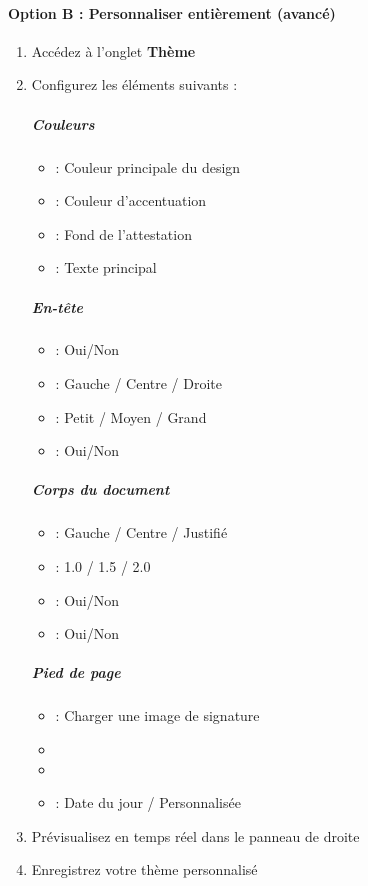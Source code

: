 \paragraph{Option B : Personnaliser entièrement (avancé)}

\begin{enumerate}[leftmargin=*]
    \item Accédez à l'onglet \textbf{Thème}
    \item Configurez les éléments suivants :

    \subparagraph{Couleurs}
    \begin{itemize}
        \item {} : Couleur principale du design
        \item {} : Couleur d'accentuation
        \item {} : Fond de l'attestation
        \item {} : Texte principal
    \end{itemize}

    \subparagraph{En-tête}
    \begin{itemize}
        \item {} : Oui/Non
        \item {} : Gauche / Centre / Droite
        \item {} : Petit / Moyen / Grand
        \item {} : Oui/Non
    \end{itemize}

    \subparagraph{Corps du document}
    \begin{itemize}
        \item {} : Gauche / Centre / Justifié
        \item {} : 1.0 / 1.5 / 2.0
        \item {} : Oui/Non
        \item {} : Oui/Non
    \end{itemize}

    \subparagraph{Pied de page}
    \begin{itemize}
        \item {} : Charger une image de signature
        \item {}
        \item {}
        \item {} : Date du jour / Personnalisée
    \end{itemize}

    \item Prévisualisez en temps réel dans le panneau de droite
    \item Enregistrez votre thème personnalisé
\end{enumerate}

